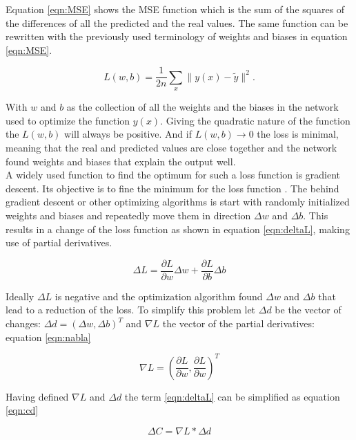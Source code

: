 Equation \ref{eqn:MSE} shows the MSE function which is the sum of the squares of the differences of all the
predicted and the real values. The same function can be rewritten with the previously used terminology of
weights and biases in equation \ref{eqn:MSE}.

\begin{equation}
 L(w,b) = \frac{1}{2n} \sum_x \| y(x) - \widetilde{y}\|^2.
 \label{eqn:MSE2}
\end{equation}

With $w$ and $b$ as the collection of all the weights and the biases in the network used to optimize the
function $y(x)$. Giving the quadratic nature of the function the $L(w,b)$ will always be positive. And if
$L(w,b) \rightarrow 0$ the loss is minimal, meaning that the real and predicted values are close together and
the network found weights and biases that explain the output well. \\
A widely used function to find the optimum for such a loss function is gradient descent. Its objective is to
fine the minimum for the loss function \cite{bottou1991stochastic}. The behind gradient descent or other
optimizing algorithms is start with randomly initialized weights and biases and repeatedly move them in
direction $\Delta w$ and $\Delta b$. This results in a change of the loss function as shown in equation
\ref{eqn:deltaL}, making use of partial derivatives.

\begin{equation}
 \Delta L = \frac{\partial L}{\partial w} \Delta w + \frac{\partial L}{\partial b} \Delta b
\label{eqn:deltaL} 
\end{equation}

Ideally $\Delta L$ is negative and the optimization algorithm found $\Delta w$ and $\Delta b$ that lead to a
reduction of the loss. To simplify this problem let $\Delta d$ be the vector of changes:
$\Delta d = (\Delta w , \Delta b)^T $ and $\nabla L$ the vector of the partial derivatives: equation
\ref{eqn:nabla}

\begin{equation}
 \nabla L = \left(\frac{\partial L}{\partial w}, \frac{\partial L}{\partial w}\right)^T
\label{eqn:nabla}
\end{equation}

Having defined $\nabla L$ and $\Delta d$ the term \ref{eqn:deltaL} can be simplified as equation \ref{eqn:cd}

\begin{equation}
\Delta C = \nabla L * \Delta d
 \label{eqn:cd}
\end{equation}

